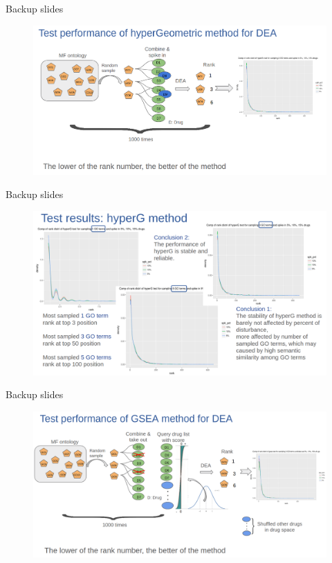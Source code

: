 \documentclass[10pt]{beamer}
\begin{document}
\begin{frame}[fragile]{Backup slides}
    \begin{figure}
        \includegraphics[width=12cm]{demo/images/test_perform_hyperG.png}
    \end{figure}
\end{frame}
\begin{frame}[fragile]{Backup slides}
    \begin{figure}
        \includegraphics[width=12cm]{demo/images/test_perform_hyperG_res.png}
    \end{figure}
\end{frame}
\begin{frame}[fragile]{Backup slides}
    \begin{figure}
        \includegraphics[width=12cm]{demo/images/test_perform_gsea.png}
    \end{figure}
\end{frame}
\end{document}

